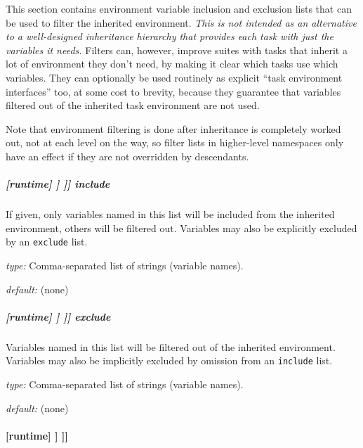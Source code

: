 This section contains environment variable inclusion and exclusion
lists that can be used to filter the inherited environment. {\em This is
not intended as an alternative to a well-designed inheritance hierarchy
that provides each task with just the variables it needs.} Filters can,
however, improve suites with tasks that inherit a lot of environment
they don't need, by making it clear which tasks use which variables.
They can optionally be used routinely as explicit ``task environment
interfaces'' too, at some cost to brevity, because they guarantee that
variables filtered out of the inherited task environment are not used.

Note that environment filtering is done after inheritance is completely
worked out, not at each level on the way, so filter lists in higher-level
namespaces only have an effect if they are not overridden by descendants.

\subparagraph[include]{[runtime] \textrightarrow [[\_\_NAME\_\_]] \textrightarrow [[[environment filter]]] \textrightarrow include}

If given, only variables named in this list will be included from the
inherited environment, others will be filtered out. Variables may also
be explicitly excluded by an \lstinline=exclude= list.

\begin{myitemize}
\item {\em type:} Comma-separated list of strings (variable names).
\item {\em default:} (none)
\end{myitemize}

\subparagraph[exclude]{[runtime] \textrightarrow [[\_\_NAME\_\_]] \textrightarrow [[[environment filter]]] \textrightarrow exclude}

Variables named in this list will be filtered out of the inherited
environment.  Variables may also be implicitly excluded by
omission from an \lstinline=include= list.

\begin{myitemize}
\item {\em type:} Comma-separated list of strings (variable names).
\item {\em default:} (none)
\end{myitemize}

\paragraph[{[[[}directives{]]]}]{[runtime] \textrightarrow [[\_\_NAME\_\_]] \textrightarrow [[[directives]]]}

